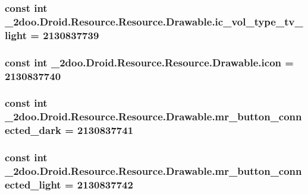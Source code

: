 \hypertarget{class__2doo_1_1_droid_1_1_resource_1_1_drawable_b270e9ba5cf2e570ee37dde6bf266a72}{
\subsubsection[{ic\_\-vol\_\-type\_\-tv\_\-light}]{\setlength{\rightskip}{0pt plus 5cm}const int \_\-2doo.Droid.Resource.Resource.Drawable.ic\_\-vol\_\-type\_\-tv\_\-light = 2130837739}}
\label{class__2doo_1_1_droid_1_1_resource_1_1_drawable_b270e9ba5cf2e570ee37dde6bf266a72}


\hypertarget{class__2doo_1_1_droid_1_1_resource_1_1_drawable_cf1ee910d23663b4ca428cd87aee6b33}{
\subsubsection[{icon}]{\setlength{\rightskip}{0pt plus 5cm}const int \_\-2doo.Droid.Resource.Resource.Drawable.icon = 2130837740}}
\label{class__2doo_1_1_droid_1_1_resource_1_1_drawable_cf1ee910d23663b4ca428cd87aee6b33}


\hypertarget{class__2doo_1_1_droid_1_1_resource_1_1_drawable_c81ed0db3c9c791c6dcef493c0911c2b}{
\subsubsection[{mr\_\-button\_\-connected\_\-dark}]{\setlength{\rightskip}{0pt plus 5cm}const int \_\-2doo.Droid.Resource.Resource.Drawable.mr\_\-button\_\-connected\_\-dark = 2130837741}}
\label{class__2doo_1_1_droid_1_1_resource_1_1_drawable_c81ed0db3c9c791c6dcef493c0911c2b}


\hypertarget{class__2doo_1_1_droid_1_1_resource_1_1_drawable_e05ce956d6d93fa81567f19400ee7512}{
\subsubsection[{mr\_\-button\_\-connected\_\-light}]{\setlength{\rightskip}{0pt plus 5cm}const int \_\-2doo.Droid.Resource.Resource.Drawable.mr\_\-button\_\-connected\_\-light = 2130837742}}
\label{class__2doo_1_1_droid_1_1_resource_1_1_drawable_e05ce956d6d93fa81567f19400ee7512}


